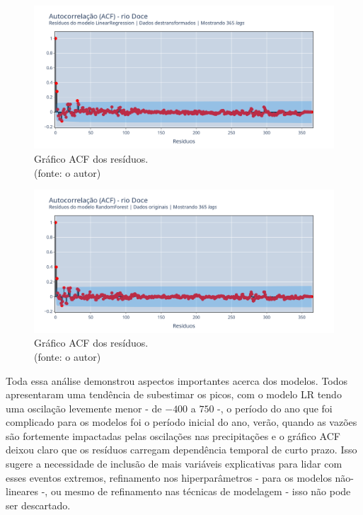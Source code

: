 \begin{figure}[!h]
	\centering
	\includegraphics[scale=0.33]{Figuras/rio_doce/wfv/LR/LR_WFV_LOG_RESID_ACF.png}
	\caption{Gráfico ACF dos resíduos.\\(fonte: o autor)}
	\label{fig:doce_LR_WFV_LOG_RESID_ACF}
\end{figure}

\begin{figure}[!h]
	\centering
	\includegraphics[scale=0.33]{Figuras/rio_doce/wfv/RF/RF_WFV_ORIG_RESID_ACF.png}
	\caption{Gráfico ACF dos resíduos.\\(fonte: o autor)}
	\label{fig:doce_RF_WFV_ORIG_RESID_ACF}
\end{figure}
\clearpage

Toda essa análise demonstrou aspectos importantes acerca dos modelos. Todos apresentaram uma tendência de subestimar os picos, com o modelo LR tendo uma oscilação levemente menor - de $-400$ a $750$ -, o período do ano que foi complicado para os modelos foi o período inicial do ano, verão, quando as vazões são fortemente impactadas pelas oscilações nas precipitações e o gráfico ACF deixou claro que os resíduos carregam dependência temporal de curto prazo. Isso sugere a necessidade de inclusão de mais variáveis explicativas para lidar com esses eventos extremos, refinamento nos hiperparâmetros - para os modelos não-lineares -, ou mesmo de refinamento nas técnicas de modelagem - isso não pode ser descartado.

